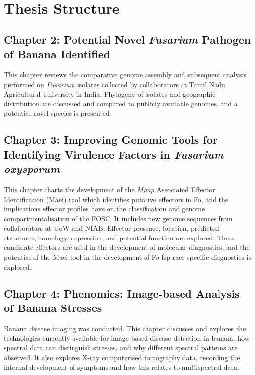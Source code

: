 \newpage
\section{Thesis Structure}

\subsection{Chapter 2: Potential Novel \textit{Fusarium} Pathogen of Banana Identified} 

This chapter reviews the comparative genome assembly and subsequent analysis performed on \textit{Fusarium} isolates collected by collaborators at Tamil Nadu Agricultural University in India. Phylogeny of isolates and geographic distribution are discussed and compared to publicly available genomes, and a potential novel species is presented. 

\subsection{Chapter 3: Improving Genomic Tools for Identifying Virulence Factors in \textit{Fusarium oxysporum}} 

This chapter charts the development of the \textit{Mimp} Associated Effector Identification (Maei) tool which identifies putative effectors in \acl{Fo}, and the implications effector profiles have on the classification and genome compartmentalisation of the FOSC. It includes new genome sequences from collaborators at UoW and NIAB. Effector presence, location, predicted structures, homology, expression, and potential function are explored. 
These candidate effectors are used in the development of molecular diagnostics, and the potential of the Maei tool in the development of \acl{Fo} \ac{fsp} race-specific diagnostics is explored. 

\subsection{Chapter 4: Phenomics: Image-based Analysis of Banana Stresses}

Banana disease imaging was conducted. This chapter discusses and explores the technologies currently available for image-based disease detection in banana, how spectral data can distinguish stresses, and why different spectral patterns are observed. 
It also explores X-ray computerised tomography data, recording the internal development of symptoms and how this relates to multispectral data.


